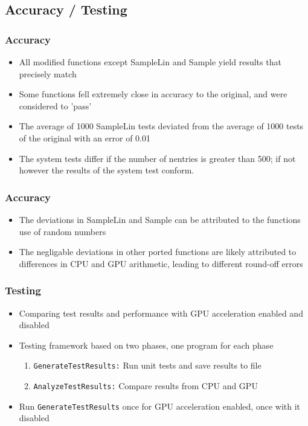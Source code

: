 \documentclass{beamer}
\begin{document}
\subsection{Accuracy / Testing}
\begin{frame}
\frametitle{Accuracy}
\begin{itemize}
\item All modified functions except SampleLin and Sample
yield results that precisely match 
\end{itemize}
\begin{itemize}
\item Some functions fell extremely close in accuracy to 
the original, and were considered to 'pass'
\item The average of 1000 SampleLin tests deviated from the 
average of 1000 tests of the original with an error of 0.01 
\end{itemize}
\begin{itemize}
\item The system tests differ if the number of nentries is 
greater than 500; if not however the results of the system 
test conform.
\end{itemize}
\end{frame}

\begin{frame}
\frametitle{Accuracy}
\begin{itemize}
\item The deviations in SampleLin and Sample can be 
attributed to the functions use of random numbers
\item The negligable deviations in other ported functions 
are likely attributed to differences in CPU and GPU 
arithmetic, leading to different round-off errors
\end{itemize}
\end{frame}

\begin{frame}
\frametitle{Testing}
\begin{itemize}
\item Comparing test results and performance with GPU acceleration enabled and disabled
\item Testing framework based on two phases, one program for each phase
\begin{enumerate}
\item \texttt{GenerateTestResults:} Run unit tests and save results to file
\item \texttt{AnalyzeTestResults:} Compare results from CPU and GPU
\end{enumerate}
\item Run \texttt{GenerateTestResults} once for GPU acceleration enabled, once with it disabled
\end{itemize}
\end{frame}
\end{document}
